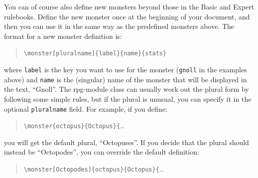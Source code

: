 \documentclass[letterpaper,serif]{rpg-module}
\begin{document}
\noindent You can of course also define new monsters beyond those in the Basic and Expert rulebooks. Define the new
monster once at the beginning of your document, and then you can use it in the same way as the predefined
monsters above. The format for a new monster definition is:
\begin{quote}
\verb|\monster[pluralname]{label}{name}{stats}|
\end{quote}
where \verb|label| is the key you want to use for the monster (\verb|gnoll| in the examples above) and
\verb|name| is the (singular) name of the monster that will be displayed in the text, ``Gnoll''. The rpg-module
class can usually work out the plural form by following some simple rules, but if the plural is unusual,
you can specify it in the optional \verb|pluralname| field. For example, if you define:
\begin{quote}
\verb|\monster{octopus}{Octopus}{|\ldots
\end{quote}
you will get the default plural, ``Octopuses''. If you decide that the plural should instead be ``Octopodes'', you can override the default definition:
\begin{quote}
\verb|\monster[Octopodes]{octopus}{Octopus}{|\ldots
\end{quote}
\end{document}
